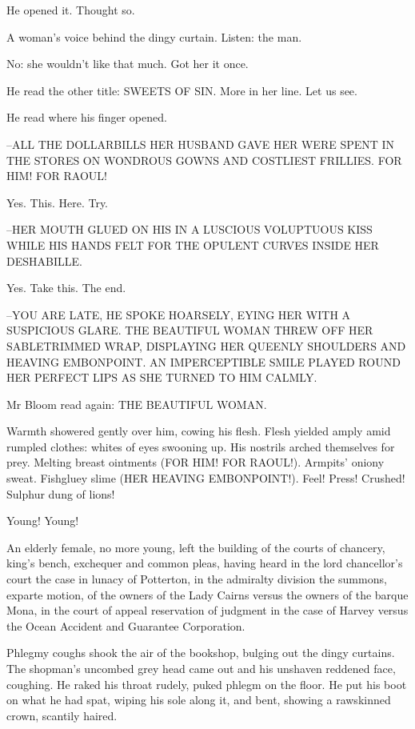 He opened it.
Thought so.

A woman's voice behind the dingy curtain.
Listen: the man.

No:
she wouldn't like that much.
Got her it once.

He read the other title:
SWEETS OF SIN.
More in her line.
Let us see.

He read where his finger opened.

--ALL THE DOLLARBILLS HER HUSBAND GAVE HER
WERE SPENT IN THE STORES ON
WONDROUS GOWNS AND COSTLIEST FRILLIES.
FOR HIM!
FOR RAOUL!

Yes.
This.
Here.
Try.

--HER MOUTH GLUED ON HIS
IN A LUSCIOUS VOLUPTUOUS KISS
WHILE HIS HANDS
FELT FOR THE OPULENT CURVES INSIDE HER DESHABILLE.

Yes.
Take this.
The end.

--YOU ARE LATE,
HE SPOKE HOARSELY,
EYING HER WITH A SUSPICIOUS GLARE.
THE BEAUTIFUL WOMAN THREW OFF HER SABLETRIMMED WRAP,
DISPLAYING HER
QUEENLY SHOULDERS AND HEAVING EMBONPOINT.
AN IMPERCEPTIBLE SMILE PLAYED
ROUND HER PERFECT LIPS
AS SHE TURNED TO HIM CALMLY.

Mr Bloom read again:
THE BEAUTIFUL WOMAN.

Warmth showered gently over him,
cowing his flesh.
Flesh yielded
amply amid rumpled clothes:
whites of eyes swooning up.
His nostrils
arched themselves for prey.
Melting breast ointments
(FOR HIM!
FOR
RAOUL!).
Armpits' oniony sweat.
Fishgluey slime
(HER HEAVING EMBONPOINT!).
Feel!
Press!
Crushed!
Sulphur dung of lions!

Young!
Young!

An elderly female,
no more young,
left the building of the courts of
chancery,
king's bench,
exchequer
and common pleas,
having heard in the
lord chancellor's court
the case in lunacy of Potterton,
in the admiralty
division
the summons, exparte motion,
of the owners of the Lady Cairns
versus the owners of the barque Mona,
in the court of appeal reservation
of judgment
in the case of Harvey versus the Ocean Accident and Guarantee
Corporation.

Phlegmy coughs shook the air of the bookshop,
bulging out the dingy
curtains.
The shopman's uncombed grey head came out
and his unshaven
reddened face,
coughing.
He raked his throat rudely,
puked phlegm on the
floor.
He put his boot on what he had spat,
wiping his sole along it,
and
bent,
showing a rawskinned crown,
scantily haired.

